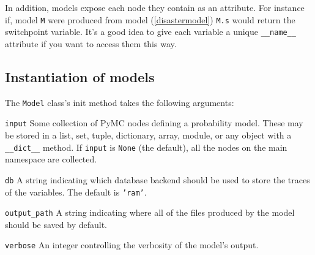 In addition, models expose each node they contain as an attribute. For instance if, model \texttt{M} were produced from model (\ref{disastermodel}) \texttt{M.s} would return the switchpoint variable. It's a good idea to give each variable a unique \texttt{\_\_name\_\_} attribute if you want to access them this way.


\subsection{Instantiation of models} \label{sec:ModelInstantiation}
The \texttt{Model} class's init method takes the following arguments:
\begin{description}
    \item \texttt{input} Some collection of PyMC nodes defining a probability model. These may be stored in a list, set, tuple, dictionary, array, module, or any object with a \texttt{\_\_dict\_\_} method. If \texttt{input} is \texttt{None} (the default), all the nodes on the main namespace are collected.
    \item \texttt{db} A string indicating which database backend should be used to store the traces of the variables. The default is \texttt{'ram'}.
    \item \texttt{output\_path} A string indicating where all of the files produced by the model should be saved by default.
    \item \texttt{verbose} An integer controlling the verbosity of the model's output.
\end{description}